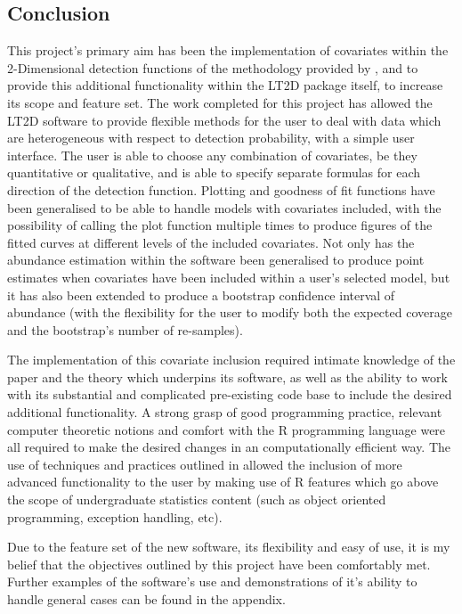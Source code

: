 \documentclass[11pt]{article}
\begin{document}
\begin{multicols}{2}
\section{Conclusion}
This project's primary aim has been the implementation of covariates within the 2-Dimensional detection functions of the methodology provided by \cite{Borchers}, and to provide this additional functionality within the LT2D package itself, to increase its scope and feature set. The work completed for this project has allowed the LT2D software  to provide flexible methods for the user to deal with data which are heterogeneous with respect to detection probability, with a simple user interface. The user is able to choose any combination of covariates, be they quantitative or qualitative, and is able to specify separate formulas for each direction of the detection function. Plotting and goodness of fit functions have been generalised to be able to handle models with covariates included, with the possibility of calling the plot function multiple times to produce figures of the fitted curves at different levels of the included covariates. Not only has the abundance estimation within the software been generalised to produce point estimates when covariates have been included within a user's selected model, but it has also been extended to produce a bootstrap confidence interval of abundance (with the flexibility for the user to modify both the expected coverage and the bootstrap's  number of re-samples). 

The implementation of this covariate inclusion required intimate knowledge of the \cite{Borchers} paper and the theory which underpins its software, as well as the ability to work with its substantial and complicated pre-existing code base to include the desired additional functionality. A strong grasp of good programming practice, relevant computer theoretic notions and comfort with the R programming language were all required to make the desired changes in an computationally efficient way. The use of techniques and practices outlined in \cite{Hadley} allowed the inclusion of more advanced functionality to the user by making use of R features which go above the scope of undergraduate statistics content (such as object oriented programming, exception handling, etc). 

Due to the feature set of the new software, its flexibility and easy of use, it is my belief that the objectives outlined by this project have been comfortably met. Further examples of the software's use and demonstrations of it's ability to handle general cases can be found in the appendix.



\end{multicols}
\end{document}
